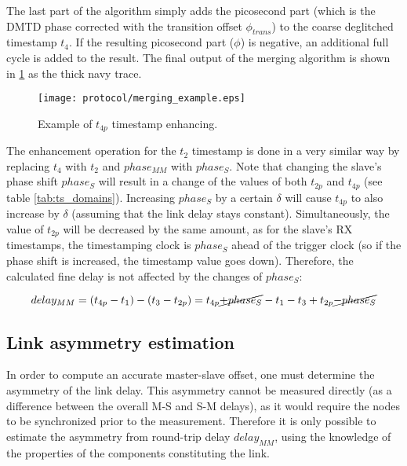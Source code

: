 The last part of the algorithm simply adds the picosecond part (which is
the DMTD phase corrected with the transition offset $\phi_{trans}$) to
the coarse deglitched timestamp $t_{4}$. If the resulting picosecond part
($\phi$) is negative, an additional full cycle is added to the result. The
final output of the merging algorithm is shown in \ref{fig:merging_example}
as the thick navy trace.
 \begin{figure}[ht!]
  \centering
  \texttt{[image: protocol/merging\_example.eps]}
  \caption{Example of $t_{4p}$ timestamp enhancing.}
  \label{fig:merging_example}
\end{figure}
The enhancement operation for the $t_{2}$ timestamp is done in a very
similar way by replacing $t_{4}$ with $t_{2}$ and $phase_{MM}$ with
$phase_{S}$. Note that changing the slave's phase shift $phase_{S}$ will
result in a change of the values of both $t_{2p}$ and $t_{4p}$ (see table
\ref{tab:ts_domains}). Increasing $phase_{S}$ by a certain $\delta$ will
cause $t_{4p}$ to also increase by $\delta$ (assuming that the link delay
stays constant). Simultaneously, the value of $t_{2p}$ will be decreased by
the same amount, as for the slave's RX timestamps, the timestamping clock is
$phase_{S}$ ahead of the trigger clock (so if the phase shift is increased,
the timestamp value goes down). Therefore, the calculated fine delay is not
affected by the changes of $phase_{S}$:

\begin{equation}
\label{eq:ptp_precise2}
delay_{MM} = (t_{4p} - t_{1}) - (t_{3} - t_{2p}) = t_{4p} \cancel{+ phase_{S}}
- t_{1} - t_{3} + t_{2p} \cancel{-phase_{S}}
\end{equation}


\subsection{Link asymmetry estimation}
\label{s:asymmetry}
In order to compute an accurate master-slave offset, one must determine the
asymmetry of the link delay. This asymmetry cannot be measured directly (as
a difference between the overall M-S and S-M delays), as it would require
the nodes to be synchronized prior to the measurement. Therefore it is
only possible to estimate the asymmetry from round-trip delay $delay_{MM}$,
using the knowledge of the properties of the components constituting the link.

